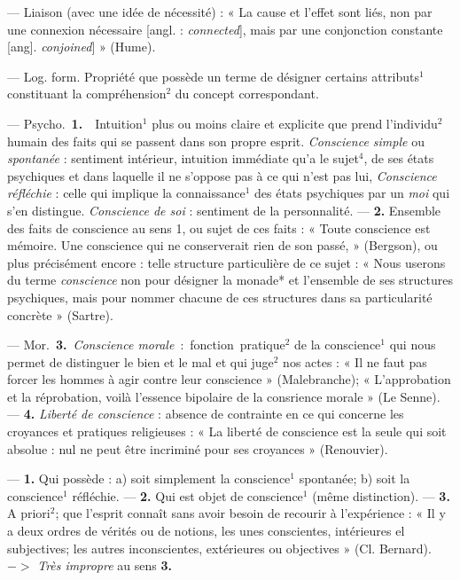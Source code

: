 \begin{itemize}[leftmargin=1cm, label=, itemsep=11pt]
 — Liaison (avec une idée
de nécessité) : « La cause et l'effet
sont liés, non par une connexion
nécessaire [angl. : {\it connected}], mais
par une conjonction constante [ang].
{\it conjoined}] » (Hume).

 — Log. form. Propriété
que possède un terme de désigner
certains attributs$^1$ constituant la
compréhension$^2$ du concept correspondant.

 — \si{Psycho.} {\bf 1.}  Intuition$^1$
plus ou moins claire et explicite
que prend l'individu$^2$ humain des
faits qui se passent dans son propre
esprit. {\it Conscience simple} ou {\it spontanée} : sentiment intérieur, intuition
immédiate qu’a le sujet$^4$, de ses
états psychiques et dans laquelle il
ne s'oppose pas à ce qui n’est pas lui,
{\it Conscience réfléchie} : celle qui implique
la connaissance$^1$ des états psychiques par un {\it moi} qui s’en distingue. {\it Conscience de soi} : sentiment
de la personnalité. —  {\bf 2.} Ensemble
des faits de conscience au sens 1, ou
sujet de ces faits : « Toute conscience
est mémoire. Une conscience qui ne
conserverait rien de son passé, »
(Bergson), ou plus précisément encore : telle structure particulière de
ce sujet : « Nous userons du terme
{\it conscience} non pour désigner la monade* et l’ensemble de ses structures
psychiques, mais pour nommer chacune de ces structures dans sa particularité concrète » (Sartre).

— \si{Mor.} {\bf 3.} {\it Conscience morale} :
fonction pratique$^2$ de la conscience$^1$
qui nous permet de distinguer le
bien et le mal et qui juge$^2$ nos actes :
« Il ne faut pas forcer les hommes à
agir contre leur conscience » (Malebranche); « L’approbation et la
réprobation, voilà l'essence bipolaire de la consrience morale » (Le
Senne). — {\bf 4.} {\it Liberté de conscience} :
absence de contrainte en ce qui
concerne les croyances et pratiques
religieuses : « La liberté de conscience
est la seule qui soit absolue : nul ne
peut être incriminé pour ses croyances » (Renouvier).

 — {\bf 1.}  Qui possède : a) soit
simplement la conscience$^1$ spontanée; b) soit la conscience$^1$ réfléchie.
— {\bf 2.}  Qui est objet de conscience$^1$
(même distinction). — {\bf 3.}  A priori$^2$;
que l'esprit connaît sans avoir besoin
de recourir à l’expérience : « Il y a
deux ordres de vérités ou de notions,
les unes conscientes, intérieures el
subjectives; les autres inconscientes,
extérieures ou objectives » (Cl. Bernard). $->$ {\it Très impropre} au
sens {\bf 3.}


\end{itemize}
